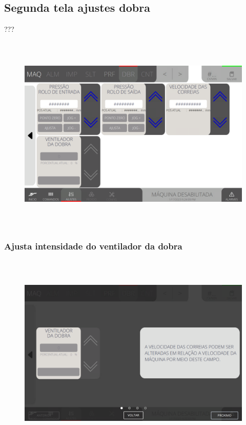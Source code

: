 \newpage
\thispagestyle{fancy}
\vspace*{\fill}
\subsection{Segunda tela ajustes dobra}
 ???
\begin{figure}[h]
  \centering
  \includegraphics[width=576px,height=360px]{src/imagesFlexo/07-fold/settings/e-Tela-Principal-2.png}
\end{figure}

\newpage
\thispagestyle{fancy}
\vspace*{\fill}
\subsubsection{\small{Ajusta intensidade do ventilador da dobra}}
\begin{figure}[h]
  \centering
  \includegraphics[width=576px,height=360px]{src/imagesFlexo/07-fold/settings/e-6.png}
\end{figure}
\vspace*{\fill}


